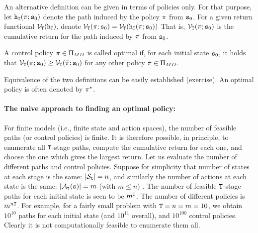 An alternative definition can be given in terms of policies only.
For that purpose, let ${{\tt h}_{\tt T}}(\pi ;{{\tt s}_0})$
denote the path induced by the policy $\pi $ from ${{\tt s}_0}$.
For a given return functional
${\mathcal{V}_{\tt T}}({{\tt h}_{\tt T}})$, denote
${\mathcal{V}_{\tt T}}(\pi ;{{\tt s}_0}) =
{\mathcal{V}_{\tt T}}({{\tt h}_{\tt T}}(\pi ;{{\tt s}_0}))$ That
is, ${\mathcal{V}_{\tt T}}(\pi ;{{\tt s}_0})$ is the cumulative
return for the path induced by $\pi $ from ${{\tt s}_0}$.

\begin{definition}
A control policy $\pi \in\Pi_{MD}$ is called optimal if, for
each initial state ${{\tt s}_0}$, it holds that
${\mathcal{V}_{\tt T}}(\pi ;{{\tt s}_0}) \ge
{\mathcal{V}_{\tt T}}(\tilde {\pi} ;{{\tt s}_0})$ for any other policy
$\tilde {\pi} \in\Pi_{MD}$.
\end{definition}

Equivalence of the two definitions can be easily established
(exercise). An optimal policy is often denoted by ${\pi ^*}$.

\vspace{10pt} 


\normalsize
\paragraph{The naive approach to finding an optimal policy:}
For finite models (i.e., finite state and action spaces), the number
of feasible paths (or control policies) is finite.  It is therefore
possible, in principle, to enumerate all ${\tt T}$-stage paths,
compute the cumulative return for each one, and choose the one which
gives the largest return. Let us evaluate the number of different
paths and control policies. Suppose for simplicity that number of
states at each stage is the same: $|{\mathcal{S}_{{\tt t}}}| = n$, and
similarly the number of actions at each state is the same:
$|{\mathcal{A}_{{\tt t}}}({\tt s})| = m$ (with $m \le n$) . The number of
feasible ${\tt T}$-stage paths for each initial state is seen to
be ${m^{\tt T}}$. The number of different policies is
${m^{n{\tt T}}}$. For example, for a fairly small problem with
${\tt T} = n = m = 10$, we obtain ${10^{10}}$ paths for each
initial state (and ${10^{11}}$ overall), and ${10^{100}}$ control
policies. Clearly it is not computationally feasible to enumerate
them all.

